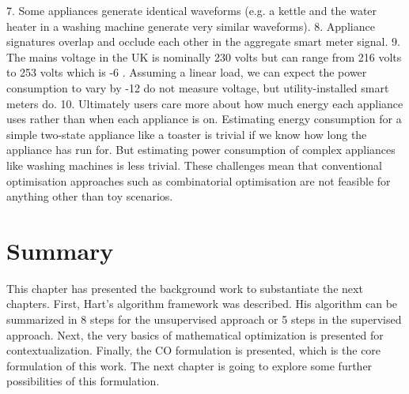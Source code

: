 7. Some appliances generate identical waveforms (e.g. a kettle and the water heater in a
washing machine generate very similar waveforms).
8. Appliance signatures overlap and occlude each other in the aggregate smart meter signal.
9. The mains voltage in the UK is nominally 230 volts but can range from 216 volts to
253 volts which is -6%
. Assuming a linear
load, we can expect the power consumption to vary by -12%
do not measure voltage, but utility-installed smart meters do.
10. Ultimately users care more about how much energy each appliance uses rather than when
each appliance is on. Estimating energy consumption for a simple two-state appliance
like a toaster is trivial if we know how long the appliance has run for. But estimating
power consumption of complex appliances like washing machines is less trivial.
These challenges mean that conventional optimisation approaches such as combinatorial optimisation
are not feasible for anything other than toy scenarios.


\fi

\section{Summary}
This chapter has presented the background work to substantiate the next chapters. First, Hart's algorithm framework was described. His algorithm can be summarized in 8 steps for the unsupervised approach or 5 steps in the supervised approach. Next, the very basics of mathematical optimization is presented for contextualization. Finally, the CO formulation is presented, which is the core formulation of this work. The next chapter is going to explore some further possibilities of this formulation. 